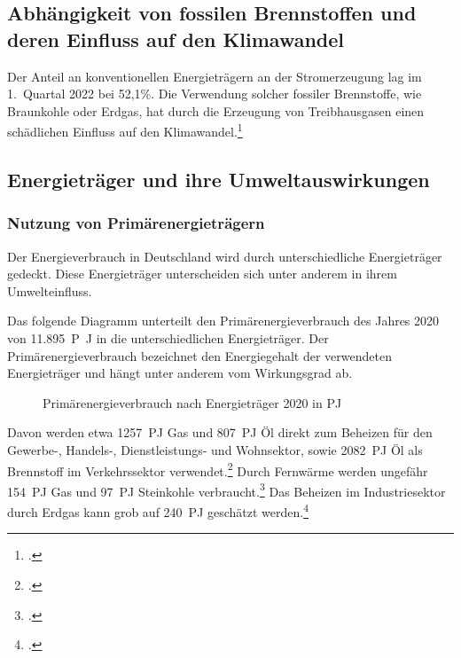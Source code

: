\documentclass[12pt, ngerman]{article}
\begin{document}
\subsection{Abhängigkeit von fossilen Brennstoffen und deren Einfluss auf den Klimawandel}

Der Anteil an konventionellen Energieträgern an der Stromerzeugung lag im 1.\ Quartal 2022 bei 52,1\%.
Die Verwendung solcher fossiler Brennstoffe, wie Braunkohle oder Erdgas, hat durch die Erzeugung von
Treibhausgasen einen schädlichen Einfluss auf den Klimawandel.\footcite{wilkeErneuerbareUndKonventionelle2013}

\subsection{Energieträger und ihre Umweltauswirkungen}

\subsubsection{Nutzung von Primärenergieträgern}

Der Energieverbrauch in Deutschland wird durch unterschiedliche Energieträger gedeckt.
Diese Energieträger unterscheiden sich unter anderem in ihrem Umwelteinfluss.

Das folgende Diagramm unterteilt den Primärenergieverbrauch des Jahres 2020 von
\qty{11.895}{P\joule}
in die unterschiedlichen Energieträger.
Der Primärenergieverbrauch bezeichnet den Energiegehalt der verwendeten Energieträger und
hängt unter anderem vom Wirkungsgrad ab.

\begin{figure}[!h]
    \caption{Primärenergieverbrauch nach Energieträger 2020 in
        \unit{PJ}}
\end{figure}

Davon werden etwa \qty{1257}{PJ} Gas und \qty{807}{PJ} Öl direkt zum Beheizen für den Gewerbe-, Handels-,
Dienstleistungs- und Wohnsektor, sowie \qty{2082}{PJ} Öl als Brennstoff im Verkehrssektor verwendet.\footcite{Energieflussbild2020PJLang}
Durch Fernwärme werden ungefähr \qty{154}{PJ} Gas und \qty{97}{PJ} Steinkohle verbraucht.\footcite{WieKannTransformation}
Das Beheizen im Industriesektor durch Erdgas kann grob auf \qty{240}{PJ} geschätzt werden.\footcite{Industrie}
\end{document}
